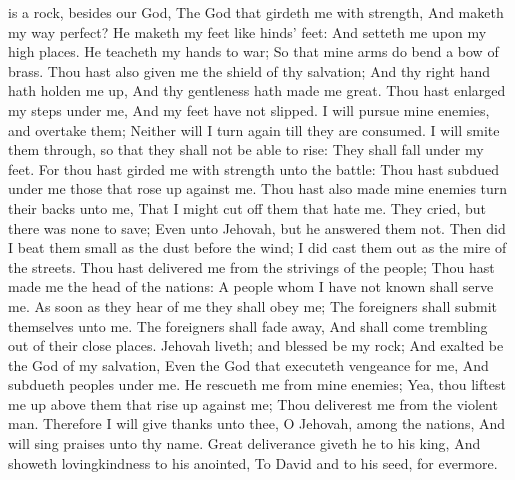 is a rock, besides our God,  The God that girdeth me with strength, And maketh my way perfect?  He maketh my feet like hinds’ feet: And setteth me upon my high places.  He teacheth my hands to war; So that mine arms do bend a bow of brass.  Thou hast also given me the shield of thy salvation; And thy right hand hath holden me up, And thy gentleness hath made me great.  Thou hast enlarged my steps under me, And my feet have not slipped.  I will pursue mine enemies, and overtake them; Neither will I turn again till they are consumed.  I will smite them through, so that they shall not be able to rise: They shall fall under my feet.  For thou hast girded me with strength unto the battle: Thou hast subdued under me those that rose up against me.  Thou hast also made mine enemies turn their backs unto me, That I might cut off them that hate me.  They cried, but there was none to save; Even unto Jehovah, but he answered them not.  Then did I beat them small as the dust before the wind; I did cast them out as the mire of the streets.  Thou hast delivered me from the strivings of the people; Thou hast made me the head of the nations: A people whom I have not known shall serve me.  As soon as they hear of me they shall obey me; The foreigners shall submit themselves unto me.  The foreigners shall fade away, And shall come trembling out of their close places.  Jehovah liveth; and blessed be my rock; And exalted be the God of my salvation,  Even the God that executeth vengeance for me, And subdueth peoples under me.  He rescueth me from mine enemies; Yea, thou liftest me up above them that rise up against me; Thou deliverest me from the violent man.  Therefore I will give thanks unto thee, O Jehovah, among the nations, And will sing praises unto thy name.  Great deliverance giveth he to his king, And showeth lovingkindness to his anointed, To David and to his seed, for evermore. 

